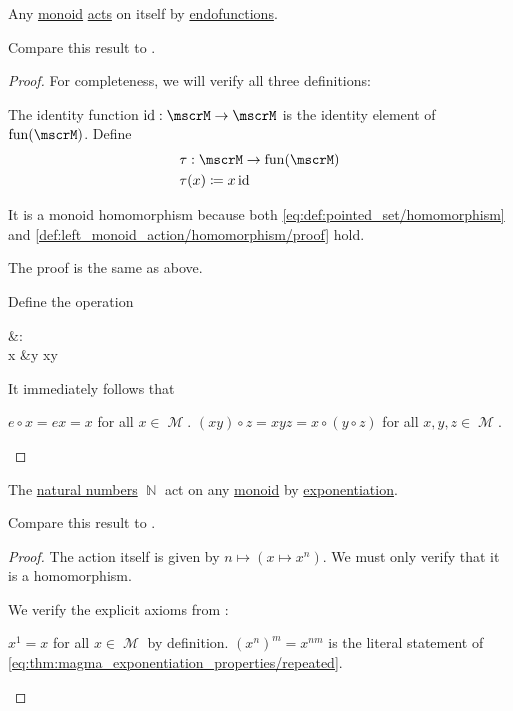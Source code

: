 \begin{proposition}\label{thm:monoid_is_action}
  Any \hyperref[def:unital_magma/associative]{monoid} \hyperref[def:left_monoid_action]{acts} on itself by \hyperref[def:endofunction]{endofunctions}.

  Compare this result to .
\end{proposition}
\begin{proof}
  For completeness, we will verify all three definitions:

   The identity function \( \Id: \mscrM \to \mscrM \) is the identity element of \( \Fun(\mscrM) \). Define
  \begin{align*}
    &\tau: \mscrM \to \Fun(\mscrM) \\
    &\tau(x) \coloneqq x \Id
  \end{align*}

  It is a monoid homomorphism because both \eqref{eq:def:pointed_set/homomorphism} and \eqref{def:left_monoid_action/homomorphism/proof} hold.

   The proof is the same as above.

   Define the operation
  \begin{BreakableAlign*}
    {}&\odot{}: \mscrM \times \mscrM \to \mscrM \\
    x &\odot y \coloneqq xy
  \end{BreakableAlign*}

  It immediately follows that
  \begin{RefList}
     \( e \circ x = ex = x \) for all \( x \in \mscrM \).
     \( (x y) \circ z = xyz = x \circ (y \circ z) \) for all \( x, y, z \in \mscrM \).
  \end{RefList}
\end{proof}

\begin{proposition}\label{thm:natural_numbers_monoid_action}
  The \hyperref[def:natural_numbers]{natural numbers} \( \BbbN \) act on any \hyperref[def:unital_magma/associative]{monoid} by \hyperref[def:unital_magma/exponentiation]{exponentiation}.

  Compare this result to .
\end{proposition}
\begin{proof}
  The action itself is given by \( n \mapsto (x \mapsto x^n) \). We must only verify that it is a homomorphism.

  We verify the explicit axioms from :
  \begin{RefList}
     \( x^1 = x \) for all \( x \in \mscrM \) by definition.
     \( (x^n)^m = x^{nm} \) is the literal statement of \eqref{eq:thm:magma_exponentiation_properties/repeated}.
  \end{RefList}
\end{proof}
